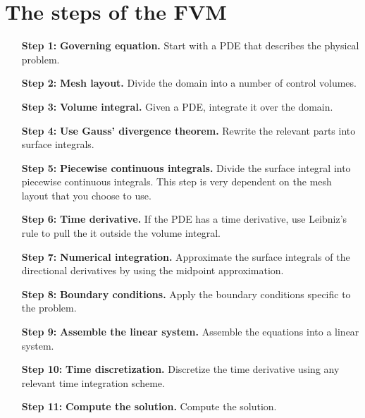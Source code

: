 \documentclass[acmtog]{acmart}
\begin{document}
\section{The steps of the FVM}
\begin{enumerate}
  \item[\textbf{Step 1:}] \textbf{Governing equation.} Start with a PDE that describes the physical problem.
  \item[\textbf{Step 2:}] \textbf{Mesh layout.} Divide the domain into a number of control volumes.
  \item[\textbf{Step 3:}] \textbf{Volume integral.} Given a PDE, integrate it over the domain.
  \item[\textbf{Step 4:}] \textbf{Use Gauss' divergence theorem.} Rewrite the relevant parts into surface integrals.
  \item[\textbf{Step 5:}] \textbf{Piecewise continuous integrals.} Divide the surface integral into piecewise continuous integrals. This step is very dependent on the mesh layout that you choose to use.
  \item[\textbf{Step 6:}] \textbf{Time derivative.} If the PDE has a time derivative, use Leibniz's rule to pull the it outside the volume integral.
  \item[\textbf{Step 7:}] \textbf{Numerical integration.} Approximate the surface integrals of the directional derivatives by using the midpoint approximation.
  \item[\textbf{Step 8:}] \textbf{Boundary conditions.} Apply the boundary conditions specific to the problem.
  \item[\textbf{Step 9:}] \textbf{Assemble the linear system.} Assemble the equations into a linear system.
  \item[\textbf{Step 10:}] \textbf{Time discretization.} Discretize the time derivative using any relevant time integration scheme.
  \item[\textbf{Step 11:}] \textbf{Compute the solution.} Compute the solution.
\end{enumerate}
\end{document}
